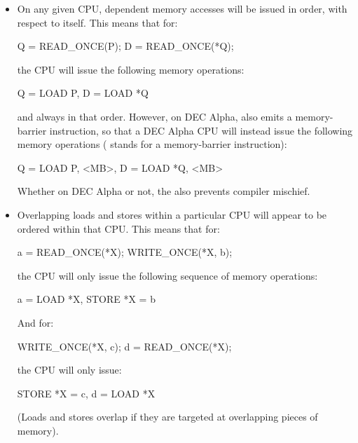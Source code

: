 \begin{itemize}
 \item On any given CPU, dependent memory accesses will be issued in order, with
       respect to itself.
       This means that for:
       \begin{VerbatimU}
	Q = READ_ONCE(P); D = READ_ONCE(*Q);
       \end{VerbatimU}

       the CPU will issue the following memory operations:

       \begin{VerbatimU}
	Q = LOAD P, D = LOAD *Q
       \end{VerbatimU}

       and always in that order.
       However, on DEC Alpha,  also
       emits a memory-barrier instruction, so that a DEC Alpha CPU will
       instead issue the following memory operations ( stands for
       a memory-barrier instruction):

       \begin{VerbatimU}
	Q = LOAD P, <MB>, D = LOAD *Q, <MB>
       \end{VerbatimU}

       Whether on DEC Alpha or not, the  also prevents compiler
       mischief.

 \item Overlapping loads and stores within a particular CPU will appear to be
       ordered within that CPU.  This means that for:

       \begin{VerbatimU}
	a = READ_ONCE(*X); WRITE_ONCE(*X, b);
       \end{VerbatimU}

       the CPU will only issue the following sequence of memory operations:

       \begin{VerbatimU}
	a = LOAD *X, STORE *X = b
       \end{VerbatimU}

       And for:

       \begin{VerbatimU}
	WRITE_ONCE(*X, c); d = READ_ONCE(*X);
       \end{VerbatimU}

       the CPU will only issue:

       \begin{VerbatimU}
	STORE *X = c, d = LOAD *X
       \end{VerbatimU}

       (Loads and stores overlap if they are targeted at overlapping pieces of
       memory).
\end{itemize}

